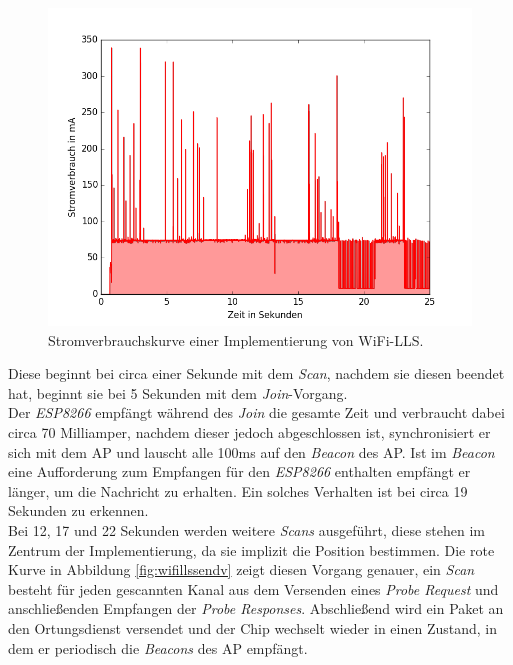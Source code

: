\begin{figure}[h!]
  \centering
	\includegraphics[width=\textwidth]{plots/wifills.png}
  \caption{Stromverbrauchskurve einer Implementierung von WiFi-LLS.}
  \label{fig:wifills}
\end{figure}

Diese beginnt bei circa einer Sekunde mit dem \emph{Scan}, nachdem sie diesen beendet hat, beginnt sie bei 5 Sekunden mit dem \emph{Join}-Vorgang.\\
Der \emph{ESP8266} empfängt während des \emph{Join} die gesamte Zeit und verbraucht dabei circa 70 Milliamper, nachdem dieser jedoch abgeschlossen ist, synchronisiert er sich mit dem AP und lauscht alle 100ms auf den \emph{Beacon} des AP.
Ist im \emph{Beacon} eine Aufforderung zum Empfangen für den \emph{ESP8266} enthalten empfängt er länger, um die Nachricht zu erhalten.
Ein solches Verhalten ist bei circa 19 Sekunden zu erkennen.\\
Bei 12, 17 und 22 Sekunden werden weitere \emph{Scans} ausgeführt, diese stehen im Zentrum der Implementierung, da sie implizit die Position bestimmen.
Die rote Kurve in Abbildung \ref{fig:wifillssendv} zeigt diesen Vorgang genauer, ein \emph{Scan} besteht für jeden gescannten Kanal aus dem Versenden eines \emph{Probe Request} und anschließenden Empfangen der \emph{Probe Responses}. 
Abschließend wird ein Paket an den Ortungsdienst versendet und der Chip wechselt wieder in einen Zustand, in dem er periodisch die \emph{Beacons} des AP empfängt.\\


